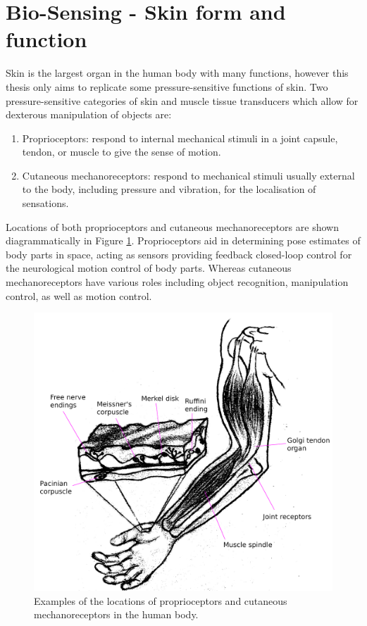 \section{Bio-Sensing - Skin form and function}
Skin is the largest organ in the human body with many functions, however this thesis only aims to replicate some pressure-sensitive functions of skin. Two pressure-sensitive categories of skin and muscle tissue transducers which allow for dexterous manipulation of objects are:
\begin{enumerate} 
    \item Proprioceptors: respond to internal mechanical stimuli in a joint capsule, tendon, or muscle to give the sense of motion.
    \item Cutaneous mechanoreceptors:  respond to mechanical stimuli usually external to the body, including pressure and vibration, for the localisation of sensations. 
\end{enumerate} 
Locations of both proprioceptors and cutaneous mechanoreceptors are shown diagrammatically in Figure \ref{fig:proprioceptors-mechanoreceptors}. Proprioceptors aid in determining pose estimates of body parts in space, acting as sensors providing feedback closed-loop control for the neurological motion control of body parts. Whereas cutaneous mechanoreceptors have various roles including object recognition, manipulation control, as well as motion control.
\begin{figure}[H]
    \centering
    \includegraphics[width=0.6\linewidth]{Figures/propriocetors_n_cutaneous_mechanoreceptors_labelled.png}
    \caption{Examples of the locations of proprioceptors and cutaneous mechanoreceptors in the human body.}
    \label{fig:proprioceptors-mechanoreceptors}
\end{figure}

